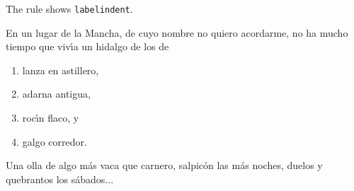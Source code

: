\documentclass[a4paper]{ltxguide}
\newcommand\3{\unskip\enspace\fbox{\fontsize{4}{4}\selectfont NEW 3.0}}
\begin{document}
The rule shows \verb|labelindent|. 

\samplesep

\showsep En un lugar de la Mancha, de cuyo nombre no quiero acordarme,
no ha mucho tiempo que viv\'{\i}a un hidalgo de los de
\begin{enumerate}[labelindent=\parindent,leftmargin=*]
\item lanza en astillero,
\item adarna antigua,
\item roc\'{\i}n flaco, y
\item galgo corredor.
\end{enumerate}
Una olla de algo m\'{a}s vaca que carnero, salpic\'{o}n las m\'{a}s
noches, duelos y quebrantos los s\'{a}bados...

\newsample
\end{document}
